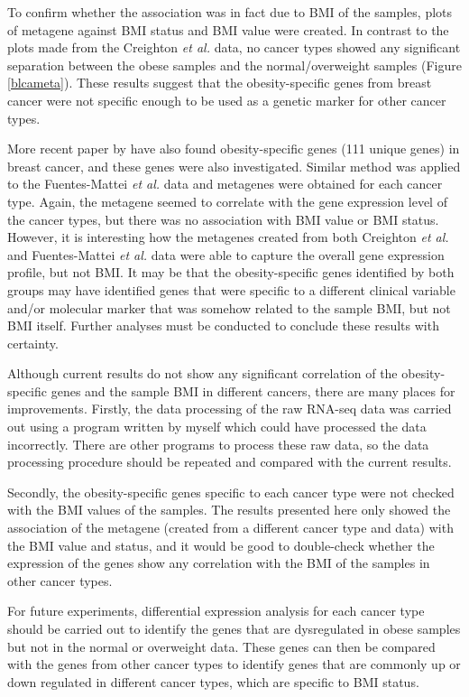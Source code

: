 \documentclass[12pt, a4paper]{article}
\begin{document}
To confirm whether the association was in fact due to BMI of the samples, plots of metagene against BMI status and BMI value were created.
In contrast to the  plots made from the Creighton \textit{et al.} data, no cancer types showed any significant separation between the obese samples and the normal/overweight samples (Figure \ref{blcameta}).
These results suggest that the obesity-specific genes from breast cancer were not specific enough to be used as a genetic marker for other cancer types.

More recent paper by \citet{Fuentes-Mattei2014} have also found  obesity-specific genes (111 unique genes) in breast cancer, and these genes were also investigated.
Similar method was applied to the Fuentes-Mattei \textit{et al.} data and metagenes were obtained for each cancer type.
Again, the metagene seemed to correlate with the gene expression level of the cancer types, but there was no association with BMI value or BMI status.
However, it is interesting how the metagenes created from both Creighton \textit{et al.} and Fuentes-Mattei \textit{et al.} data were able to capture the overall gene expression profile, but not BMI.
It may be that the obesity-specific genes identified by both groups may have identified genes that were specific to a different clinical variable and/or molecular marker that was somehow related to the sample BMI, but not BMI itself.
Further analyses must be conducted to conclude these results with certainty.

Although current results do not show any significant correlation of the obesity-specific genes and the sample BMI in different cancers, there are many places for improvements.
Firstly, the data processing of the raw RNA-seq data was carried out using a program written by myself which could have processed the data incorrectly.
There are other programs to process these raw data, so the data processing procedure should be repeated and compared with the current results.

Secondly, the obesity-specific genes specific to each cancer type were not checked with the BMI values of the samples.
The results presented here only showed the association of the metagene (created from a different cancer type and data) with the BMI value and status, and it would be good to double-check whether the expression of the genes show any correlation with the BMI of the samples in other cancer types.

For future experiments, differential expression analysis for each cancer type should be carried out to identify the genes that are dysregulated in obese samples but not in the normal or overweight data.
These genes can then be compared with the genes from other cancer types to identify genes that are  commonly up or down regulated in different cancer types, which are specific to BMI status.


\vspace{-11pt}



\end{document}

